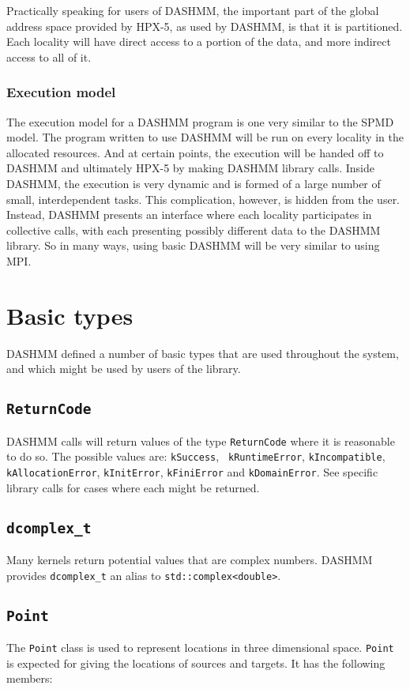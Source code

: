 \documentclass[11pt]{book}
\begin{document}
Practically speaking for users of DASHMM, the important part of the global
address space provided by HPX-5, as used by DASHMM, is that it is partitioned.
Each locality will have direct access to a portion of the data, and more
indirect access to all of it.

\subsubsection{Execution model} 
The execution model for a DASHMM program is one very similar to the SPMD model.
The program written to use DASHMM will be run on every locality in the allocated
resources. And at certain points, the execution will be handed off to DASHMM and
ultimately HPX-5 by making DASHMM library calls. Inside DASHMM, the execution is
very dynamic and is formed of a large number of small, interdependent tasks.
This complication, however, is hidden from the user. Instead, DASHMM presents
an interface where each locality participates in collective calls, with each
presenting possibly different data to the DASHMM library. So in many ways,
using basic DASHMM will be very similar to using MPI.

\section{Basic types} 
DASHMM defined a number of basic types that are used throughout the system,
and which might be used by users of the library.

\subsection{{\tt ReturnCode}}

DASHMM calls will return values of the type {\tt ReturnCode} where it is
reasonable to do so. The possible values are: {\tt kSuccess}, {\tt
  kRuntimeError}, {\tt kIncompatible},
{\tt kAllocationError}, {\tt kInitError}, {\tt kFiniError} and 
{\tt kDomainError}. See specific
library calls for cases where each might be returned.

\subsection{{\tt dcomplex\_t}}
Many kernels return potential values that are complex numbers. DASHMM provides
{\tt dcomplex\_t} an alias to {\tt std::complex<double>}. 

\subsection{{\tt Point}}
The {\tt Point} class is used to represent locations in three dimensional space.
{\tt Point} is expected for giving the locations of sources and targets. It has
the following members:
\end{document}
